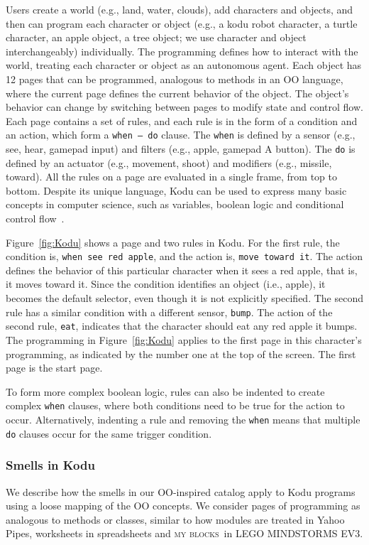 \documentclass{sig-alternate}
\newcommand{\ms}{LEGO MINDSTORMS EV3}
\newcommand{\mbs}{\textsc{my blocks}}
\begin{document}
Users create a world (e.g., land, water, clouds),  add characters and objects, and then can program each character or object (e.g., a kodu robot character, a turtle character, an apple object, a tree object; we use character and object interchangeably) individually. The programming defines how to interact with the world, treating each character or object as an autonomous agent. Each object has 12 pages that can be programmed, analogous to methods in an OO language, where the current page defines the current behavior of the object. 
The object's behavior can change by switching between pages to modify state and control flow. 
Each page contains a set of rules, and each rule is in the form of a condition and an action, which form a {\tt when~--~do} clause. The {\tt when} is defined by a sensor (e.g., see, hear, gamepad input) and filters (e.g., apple, gamepad A button). The {\tt do} is defined by an actuator (e.g., movement, shoot) and modifiers (e.g., missile, toward). All the rules on a page are evaluated in a single frame, from top to bottom. 
Despite its unique language, Kodu  can be used to express many basic concepts in computer science, such as variables, boolean logic and conditional control flow~\cite{Stolee:2011:ECS:1953163.1953197}. 

Figure~\ref{fig:Kodu} shows a page and two rules  in Kodu. For the first rule, the condition is, {\tt when see red apple}, and the action is, {\tt move toward it}. The action defines the behavior of this particular character when it sees a red apple, that is, it moves toward it. Since the condition identifies an object (i.e., apple), it becomes the default selector, even though it is not explicitly specified. The second rule has a similar condition with a different sensor, {\tt bump}. The action of the second rule, {\tt eat}, indicates that the character should eat any red apple it bumps. 
The programming in Figure~\ref{fig:Kodu} applies to the first page in this character's programming, as indicated by the number one at the top of the screen. The first page is the  start page.

To form more complex boolean logic, rules can also be indented to create complex {\tt when} clauses, where both conditions need to be true for the action to occur. Alternatively, indenting a rule and removing the {\tt when} means that multiple {\tt do} clauses occur for the same trigger condition. 





\subsubsection{Smells in Kodu}
We describe how the smells in our OO-inspired catalog apply to Kodu programs using a loose mapping of the OO concepts. We consider pages of programming as analogous to methods or classes, similar to how modules are treated in Yahoo Pipes, worksheets in spreadsheets and \mbs~in \ms. 
\end{document}
